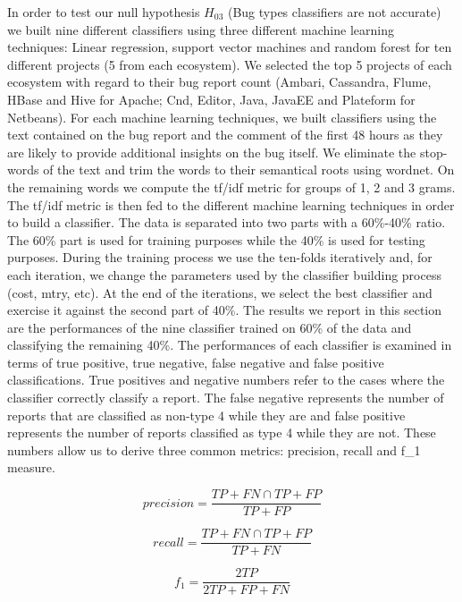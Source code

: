 \documentclass[natbib]{svjour3}
\begin{document}
In order to test our null hypothesis \(H_{03}\) (Bug types classifiers
are not accurate) we built nine different classifiers using three
different machine learning techniques: Linear regression, support vector
machines and random forest for ten different projects (5 from each
ecosystem). We selected the top 5 projects of each ecosystem with regard
to their bug report count (Ambari, Cassandra, Flume, HBase and Hive for
Apache; Cnd, Editor, Java, JavaEE and Plateform for Netbeans). For each
machine learning techniques, we built classifiers using the text
contained on the bug report and the comment of the first 48 hours as
they are likely to provide additional insights on the bug itself. We
eliminate the stop-words of the text and trim the words to their
semantical roots using wordnet. On the remaining words we compute the
tf/idf metric for groups of 1, 2 and 3 grams. The tf/idf metric is then
fed to the different machine learning techniques in order to build a
classifier. The data is separated into two parts with a 60\%-40\% ratio.
The 60\% part is used for training purposes while the 40\% is used for
testing purposes. During the training process we use the ten-folds
iteratively and, for each iteration, we change the parameters used by
the classifier building process (cost, mtry, etc). At the end of the
iterations, we select the best classifier and exercise it against the
second part of 40\%. The results we report in this section are the
performances of the nine classifier trained on 60\% of the data and
classifying the remaining 40\%. The performances of each classifier is
examined in terms of true positive, true negative, false negative and
false positive classifications. True positives and negative numbers
refer to the cases where the classifier correctly classify a report. The
false negative represents the number of reports that are classified as
non-type 4 while they are and false positive represents the number of
reports classified as type 4 while they are not. These numbers allow us
to derive three common metrics: precision, recall and f\_1 measure.

\begin{equation}
precision = \frac{TP+FN \cap TP+FP}{TP+FP}
\end{equation}

\begin{equation}
recall = \frac{TP+FN \cap TP+FP}{TP+FN}
\end{equation}

\begin{equation}
f_1 = \frac{2TP}{2TP + FP + FN}
\end{equation}
\end{document}
